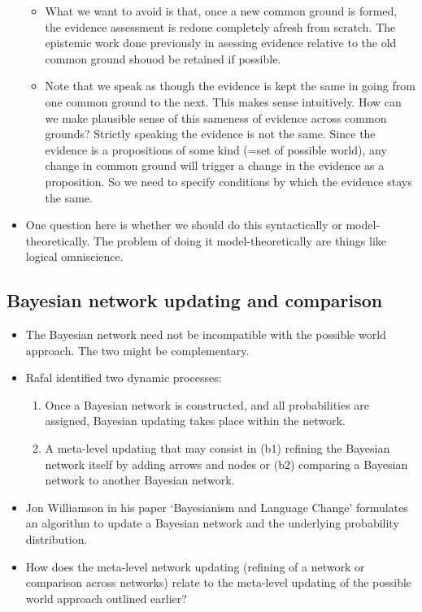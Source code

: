 \documentclass[
  11pt,
  dvipsnames,enabledeprecatedfontcommands]{scrartcl}
\begin{document}
\begin{itemize}
  \begin{itemize}
  \item
    What we want to avoid is that, once a new common ground is formed,
    the evidence assessment is redone completely afresh from scratch.
    The epistemic work done previously in asessing evidence relative to
    the old common ground shouod be retained if possible.
  \item
    Note that we speak as though the evidence is kept the same in going
    from one common ground to the next. This makes sense intuitively.
    How can we make plausible sense of this sameness of evidence across
    common grounds? Strictly speaking the evidence is not the same.
    Since the evidence is a propositions of some kind (=set of possible
    world), any change in common ground will trigger a change in the
    evidence as a proposition. So we need to specify conditions by which
    the evidence stays the same.
  \end{itemize}
\item
  One question here is whether we should do this syntactically or
  model-theoretically. The problem of doing it model-theoretically are
  things like logical omniscience.
\end{itemize}

\hypertarget{bayesian-network-updating-and-comparison}{%
\subsection{Bayesian network updating and
comparison}\label{bayesian-network-updating-and-comparison}}

\begin{itemize}
\item
  The Bayesian network need not be incompatible with the possible world
  approach. The two might be complementary.
\item
  Rafal identified two dynamic processes:

  \begin{enumerate}
  \def\labelenumi{\alph{enumi}.}
  \item
    Once a Bayesian network is constructed, and all probabilities are
    assigned, Bayesian updating takes place within the network.
  \item
    A meta-level updating that may consist in (b1) refining the Bayesian
    network itself by adding arrows and nodes or (b2) comparing a
    Bayesian network to another Bayesian network.
  \end{enumerate}
\item
  Jon Williamson in his paper `Bayesianism and Language Change'
  formulates an algorithm to update a Bayesian network and the
  underlying probability distribution.
\item
  How does the meta-level network updating (refining of a network or
  comparison across networks) relate to the meta-level updating of the
  possible world approach outlined earlier?
\end{itemize}
\end{document}
